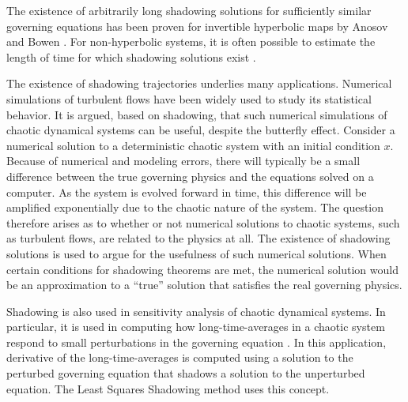 The existence of arbitrarily long shadowing solutions for sufficiently similar governing equations
has been proven for invertible hyperbolic maps by Anosov \cite{anosov} and Bowen \cite{bowen}.
For non-hyperbolic systems, it is often possible to estimate the length of time for which shadowing
solutions exist \cite{grebogi}\cite{hammel}.

The existence of shadowing trajectories underlies many applications.
Numerical simulations of turbulent flows have been widely used to study its statistical behavior.
It is argued, based on shadowing, that such numerical simulations of chaotic dynamical systems can be
useful, despite the butterfly effect. Consider a numerical solution to a deterministic chaotic system with an initial condition $x$.
Because of numerical and modeling errors, there will typically be a small difference between the
true governing physics and the equations solved on a computer.  As the system is evolved forward
in time, this difference will be amplified exponentially due to the chaotic nature of the system.
The question therefore arises as to whether or not numerical solutions to chaotic systems, such
as turbulent flows, are related to the physics at all.  The existence of shadowing solutions
is used to argue for the usefulness of such numerical solutions.
When certain conditions for shadowing theorems are met, the numerical solution would be an
approximation to a ``true'' solution that satisfies the real governing physics.

Shadowing is also used in sensitivity analysis of chaotic dynamical systems.  In particular,
it is used in computing how long-time-averages in a chaotic system
respond to small perturbations in the governing equation \cite{qiqi-lss}\cite{angxiu-lss}\cite{lasagna}. In this application, derivative
of the long-time-averages is computed using a solution to the perturbed governing equation
that shadows a solution to the unperturbed equation.  The Least Squares Shadowing \cite{qiqi-lss}\cite{angxiu-lss} method
uses this concept.

